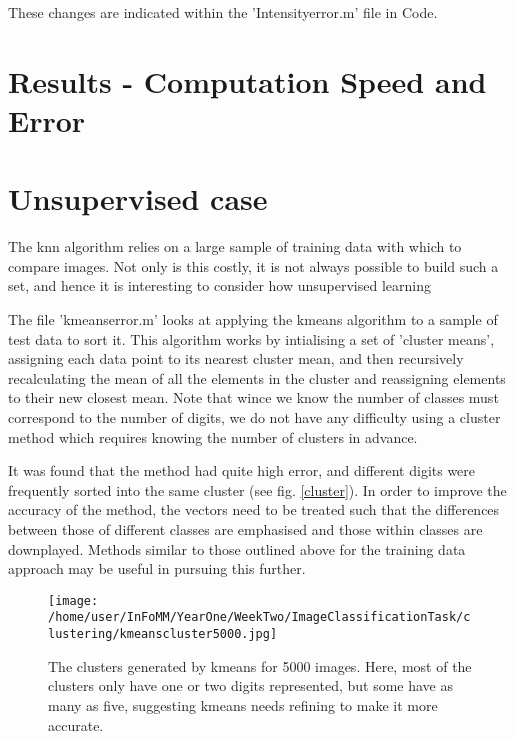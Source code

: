 \documentclass[12pt]{article}
\begin{document}
These changes are indicated within the 'Intensityerror.m' file in Code.

\section{Results - Computation Speed and Error}

\section{Unsupervised case}

The knn algorithm relies on a large sample of training data with which to compare images. Not only is this costly, it is not always possible to build such a set, and hence it is interesting to consider how unsupervised learning

The file 'kmeanserror.m' looks at applying the kmeans algorithm to a sample of test data to sort it. This algorithm works by intialising a set of 'cluster means', assigning each data point to its nearest cluster mean, and then recursively recalculating the mean of all the elements in the cluster and reassigning elements to their new closest mean. Note that wince we know the number of classes must correspond to the number of digits, we do not have any difficulty using a cluster method which requires knowing the number of clusters in advance. 

It was found that the method had quite high error, and different digits were frequently sorted into the same cluster (see fig. \ref{cluster}). In order to improve the accuracy of the method, the vectors need to be treated such that the differences between those of different classes are emphasised and those within classes are downplayed. Methods similar to those outlined above for the training data approach may be useful in pursuing this further.

\begin{figure}
  \texttt{[image: /home/user/InFoMM/YearOne/WeekTwo/ImageClassificationTask/clustering/kmeanscluster5000.jpg]}
  \caption{The clusters generated by kmeans for 5000 images. Here, most of the clusters only have one or two digits represented, but some have as many as five, suggesting kmeans needs refining to make it more accurate.}
  \label{fig:cluster}
\end{figure}





\end{document}
